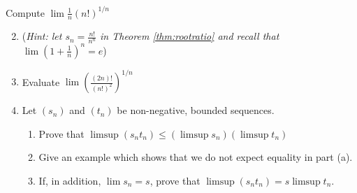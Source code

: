 \begin{exercisessec}{}{}
	\exstart Compute $\lim \frac 1n(n!)^{1/n}$\vspace{-5pt}
	\begin{enumerate}\setcounter{enumi}{1}
  	\item[](\emph{Hint: let $s_n=\frac{n!}{n^n}$ in Theorem \ref{thm:rootratio} and recall that $\lim\left(1+\frac 1n\right)^n=e$})
  
  	\item Evaluate $\lim\left(\frac{(2n)!}{(n!)^2}\right)^{1/n}$
  
  	\item\label{exs:limsupprod} Let $(s_n)$ and $(t_n)$ be non-negative, bounded sequences.
		\begin{enumerate}
			\item Prove that $\limsup(s_nt_n)\le\left(\limsup s_n\right)\left(\limsup t_n\right)$
			\item Give an example which shows that we do not expect equality in part (a).
			\item If, in addition, $\lim s_n=s$, prove that $\limsup(s_nt_n)=s\limsup t_n$.
		\end{enumerate}
% 	


\end{enumerate}
\end{exercisessec}
